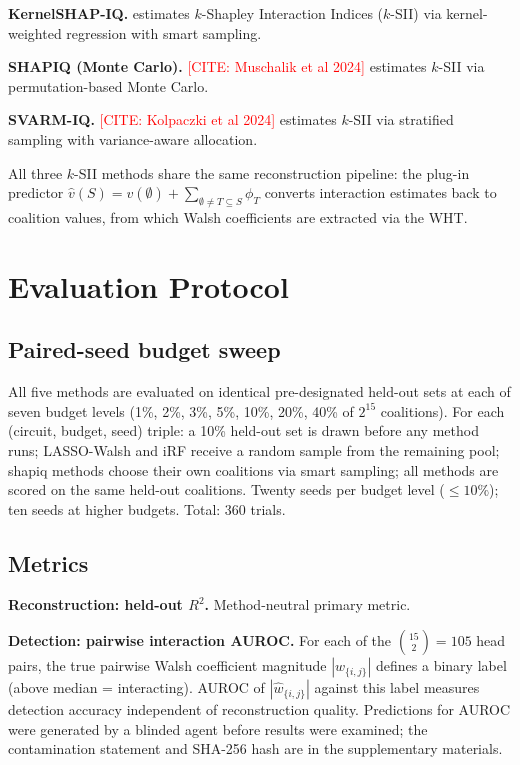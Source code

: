 \documentclass[11pt]{article}
\newcommand{\citeneeded}[1]{\textcolor{red}{[CITE: #1]}}
\begin{document}
\textbf{KernelSHAP-IQ.}
\citet{fumagalli2024kernelshapiq} estimates $k$-Shapley Interaction
Indices ($k$-SII) \citep{bordt2023shapley, grabisch1997korder} via
kernel-weighted regression with smart sampling.

\textbf{SHAPIQ (Monte Carlo).}
\citeneeded{Muschalik et al 2024} estimates $k$-SII via
permutation-based Monte Carlo.

\textbf{SVARM-IQ.}
\citeneeded{Kolpaczki et al 2024} estimates $k$-SII via stratified
sampling with variance-aware allocation.

All three $k$-SII methods share the same reconstruction pipeline:
the plug-in predictor
$\hat{v}(S) = v(\emptyset) + \sum_{\emptyset \neq T \subseteq S} \phi_T$
converts interaction estimates back to coalition values, from which
Walsh coefficients are extracted via the WHT.


\section{Evaluation Protocol}
\label{sec:protocol}

\subsection{Paired-seed budget sweep}

All five methods are evaluated on identical pre-designated held-out
sets at each of seven budget levels (1\%, 2\%, 3\%, 5\%, 10\%, 20\%,
40\% of $2^{15}$ coalitions). For each (circuit, budget, seed) triple:
a 10\% held-out set is drawn before any method runs; LASSO-Walsh and
iRF receive a random sample from the remaining pool; shapiq methods
choose their own coalitions via smart sampling; all methods are scored
on the same held-out coalitions. Twenty seeds per budget level
($\leq 10\%$); ten seeds at higher budgets. Total: 360 trials.

\subsection{Metrics}

\textbf{Reconstruction: held-out $R^2$.} Method-neutral primary
metric.

\textbf{Detection: pairwise interaction AUROC.} For each of the
$\binom{15}{2} = 105$ head pairs, the true pairwise Walsh coefficient
magnitude $|w_{\{i,j\}}|$ defines a binary label (above median =
interacting). AUROC of $|\hat{w}_{\{i,j\}}|$ against this label
measures detection accuracy independent of reconstruction quality.
Predictions for AUROC were generated by a blinded agent before
results were examined; the contamination statement and SHA-256 hash
are in the supplementary materials.
\end{document}
